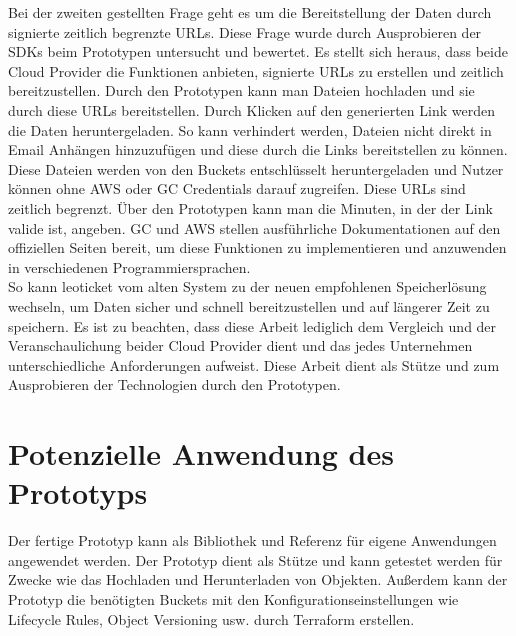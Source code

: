 Bei der zweiten gestellten Frage geht es um die Bereitstellung der Daten durch signierte zeitlich begrenzte URLs. Diese Frage wurde durch Ausprobieren der SDKs beim Prototypen untersucht und bewertet. Es stellt sich heraus, dass beide Cloud Provider die Funktionen anbieten, signierte URLs zu erstellen und zeitlich bereitzustellen. Durch den Prototypen kann man Dateien hochladen und sie durch diese URLs bereitstellen. Durch Klicken auf den generierten Link werden die Daten heruntergeladen. So kann verhindert werden, Dateien nicht direkt in Email Anhängen hinzuzufügen und diese durch die Links bereitstellen zu können. Diese Dateien werden von den Buckets entschlüsselt heruntergeladen und Nutzer können ohne AWS oder GC Credentials darauf zugreifen. Diese URLs sind zeitlich begrenzt. Über den Prototypen kann man die Minuten, in der der Link valide ist, angeben. GC und AWS stellen ausführliche Dokumentationen auf den offiziellen Seiten bereit, um diese Funktionen zu implementieren und anzuwenden in verschiedenen Programmiersprachen.\\

So kann leoticket vom alten System zu der neuen empfohlenen Speicherlösung wechseln, um Daten sicher und schnell bereitzustellen und auf längerer Zeit zu speichern. Es ist zu beachten, dass diese Arbeit lediglich dem Vergleich und der Veranschaulichung beider Cloud Provider dient und das jedes Unternehmen unterschiedliche Anforderungen aufweist. Diese Arbeit dient als Stütze und zum Ausprobieren der Technologien durch den Prototypen. 


\section{Potenzielle Anwendung des Prototyps}

Der fertige Prototyp kann als Bibliothek und Referenz für eigene Anwendungen angewendet werden. 
Der Prototyp dient als Stütze und kann getestet werden für Zwecke wie das Hochladen und Herunterladen von Objekten. Außerdem kann der Prototyp die benötigten Buckets mit den Konfigurationseinstellungen wie Lifecycle Rules, Object Versioning usw. durch Terraform erstellen.